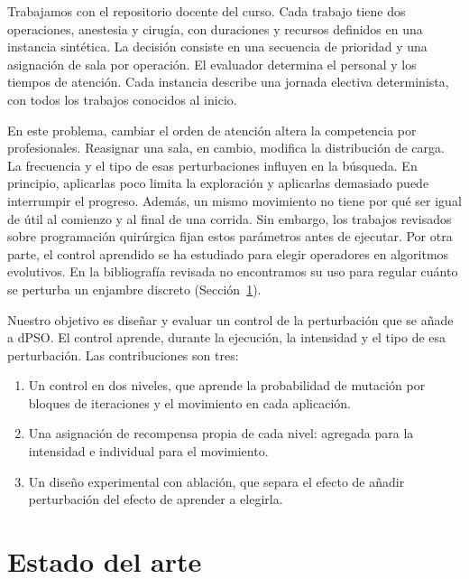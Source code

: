 \documentclass[10pt,a4paper]{article}
\begin{document}
Trabajamos con el repositorio docente del curso. Cada trabajo tiene dos operaciones, anestesia
y cirugía, con duraciones y recursos definidos en una instancia sintética. La decisión consiste en
una secuencia de prioridad y una asignación de sala por operación. El evaluador determina el
personal y los tiempos de atención. Cada instancia describe una jornada electiva determinista,
con todos los trabajos conocidos al inicio.

En este problema, cambiar el orden de atención altera la competencia por profesionales.
Reasignar una sala, en cambio, modifica la distribución de carga. La frecuencia y el tipo de esas
perturbaciones influyen en la búsqueda. En principio, aplicarlas poco limita la exploración y
aplicarlas demasiado puede interrumpir el progreso. Además, un mismo movimiento no tiene por qué
ser igual de útil al comienzo y al final de una corrida. Sin embargo, los trabajos revisados sobre
programación quirúrgica fijan estos parámetros antes de ejecutar. Por otra parte, el control
aprendido se ha estudiado para elegir operadores en algoritmos evolutivos. En la bibliografía
revisada no encontramos su uso para regular cuánto se perturba un enjambre discreto
(Sección~\ref{sec:arte}).

Nuestro objetivo es diseñar y evaluar un control de la perturbación que se añade a dPSO. El
control aprende, durante la ejecución, la intensidad y el tipo de esa perturbación. Las
contribuciones son tres:
\begin{enumerate}
\setlength{\itemsep}{0pt}
\item Un control en dos niveles, que aprende la probabilidad de mutación por bloques de
iteraciones y el movimiento en cada aplicación.
\item Una asignación de recompensa propia de cada nivel: agregada para la intensidad e
individual para el movimiento.
\item Un diseño experimental con ablación, que separa el efecto de añadir perturbación del
efecto de aprender a elegirla.
\end{enumerate}

\section{Estado del arte}
\label{sec:arte}
\end{document}
